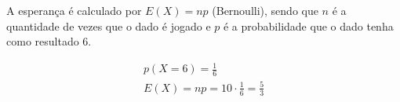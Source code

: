 \item
  
A esperança é calculado por $E(X) = np$ (Bernoulli), sendo que $n$ é a quantidade de vezes que o dado é jogado e $p$ é a probabilidade que o dado tenha como resultado 6.

\[\begin{array}{l}
p(X=6) = \frac{1}{6} \\
E(X) = np = 10 \cdot \frac{1}{6} = \frac{5}{3}
\end{array}\]

